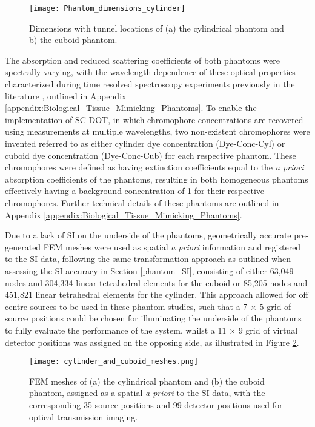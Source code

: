 \documentclass[twoside]{bhamthesis}
\theoremstyle{definition}
\begin{document}
\begin{figure}[!ht]
\texttt{[image: Phantom\_dimensions\_cylinder]}
\centering
\caption {Dimensions with tunnel locations of (a) the cylindrical phantom and b) the cuboid phantom.}
\label{fig:Phantom_dimensions_cylinder}
\end{figure}

The absorption and reduced scattering coefficients of both phantoms were spectrally varying, with the wavelength dependence of these optical properties characterized during time resolved spectroscopy experiments previously in the literature \cite{guggenheim2016time}, outlined in Appendix \ref{appendix:Biological_Tissue_Mimicking_Phantoms}. To enable the implementation of SC-DOT, in which chromophore concentrations are recovered using measurements at multiple wavelengths, two non-existent chromophores were invented referred to as either cylinder dye concentration (Dye-Conc-Cyl) or cuboid dye concentration (Dye-Conc-Cub) for each respective phantom. These chromophores were defined as having extinction coefficients equal to the \textit{a priori} absorption coefficients of the phantoms, resulting in both homogeneous phantoms effectively having a background concentration of 1 for their respective chromophores. Further technical details of these phantoms are outlined in Appendix \ref{appendix:Biological_Tissue_Mimicking_Phantoms}. 

Due to a lack of SI on the underside of the phantoms, geometrically accurate pre-generated FEM meshes were used as spatial \textit{a priori} information and registered to the SI data, following the same transformation approach as outlined when assessing the SI accuracy in Section \ref{phantom_SI}, consisting of either  63,049 nodes and 304,334 linear tetrahedral elements for the cuboid or 85,205 nodes and 451,821 linear tetrahedral elements for the cylinder. This approach allowed for off centre sources to be used in these phantom studies, such that a 7 $\times$ 5 grid of source positions could be chosen for illuminating the underside of the phantoms to fully evaluate the performance of the system, whilst a 11 $\times$ 9 grid of virtual detector positions was assigned on the opposing side, as illustrated in Figure \ref{fig:Cylinder_and_cuboid_FEM_meshes}.

\begin{figure}[!ht]
\centering\texttt{[image: cylinder\_and\_cuboid\_meshes.png]}
\caption{FEM meshes of (a) the cylindrical phantom and (b) the cuboid phantom, assigned as a spatial \textit{a priori} to the SI data, with the corresponding 35 source positions and 99 detector positions used for optical transmission imaging.}
\label{fig:Cylinder_and_cuboid_FEM_meshes}
\end{figure}
\end{document}
